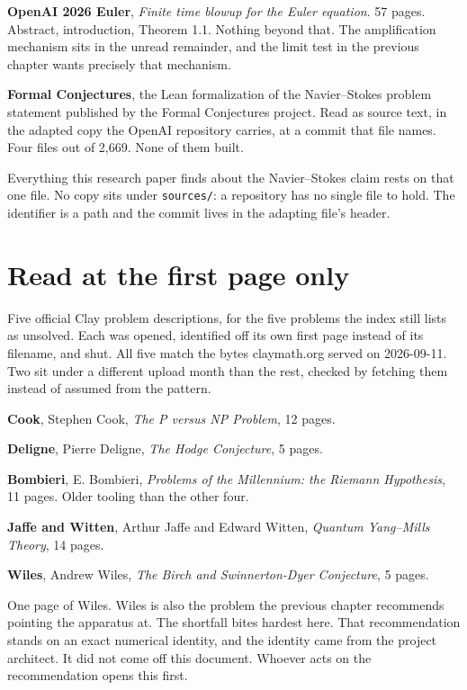 \textbf{OpenAI 2026 Euler}, \emph{Finite time blowup for the Euler equation}. 57 pages. Abstract,
introduction, Theorem 1.1. Nothing beyond that. The amplification mechanism sits in the unread
remainder, and the limit test in the previous chapter wants precisely that mechanism.

\textbf{Formal Conjectures}, the Lean formalization of the Navier--Stokes problem statement
published by the Formal Conjectures project. Read as source text, in the adapted copy the OpenAI
repository carries, at a commit that file names. Four files out of 2{,}669. None of them built.

Everything this research paper finds about the Navier--Stokes claim rests on that one file. No copy sits under
\texttt{sources/}: a repository has no single file to hold. The identifier is a path and the
commit lives in the adapting file's header.

\section{Read at the first page only}

Five official Clay problem descriptions, for the five problems the index still lists as unsolved.
Each was opened, identified off its own first page instead of its filename, and shut. All five match
the bytes claymath.org served on 2026-09-11. Two sit under a different upload month than the rest,
checked by fetching them instead of assumed from the pattern.

\textbf{Cook}, Stephen Cook, \emph{The P versus NP Problem}, 12 pages.

\textbf{Deligne}, Pierre Deligne, \emph{The Hodge Conjecture}, 5 pages.

\textbf{Bombieri}, E. Bombieri, \emph{Problems of the Millennium: the Riemann Hypothesis}, 11
pages. Older tooling than the other four.

\textbf{Jaffe and Witten}, Arthur Jaffe and Edward Witten, \emph{Quantum Yang--Mills Theory}, 14
pages.

\textbf{Wiles}, Andrew Wiles, \emph{The Birch and Swinnerton-Dyer Conjecture}, 5 pages.

One page of Wiles. Wiles is also the problem the previous chapter recommends pointing the apparatus
at. The shortfall bites hardest here. That recommendation stands on an exact numerical identity,
and the identity came from the project architect. It did not come off this document. Whoever acts on
the recommendation opens this first.

